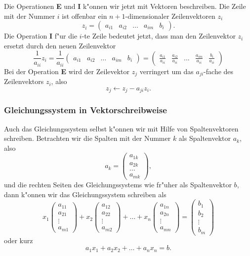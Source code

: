 Die Operationen {\bf E} und {\bf I} k"onnen wir jetzt mit Vektoren
beschreiben. Die Zeile mit der Nummer $i$ ist offenbar ein
$n+1$-dimensionaler Zeilenvektoren $z_i$
$$z_i=\begin{pmatrix}a_{i1}&a_{i2}&\dots&a_{im}&b_i\end{pmatrix}.$$
Die Operation {\bf I} f"ur die $i$-te Zeile bedeutet jetzt, dass man
den Zeilenvektor $z_i$ ersetzt durch den neuen Zeilenvektor
$$\frac1{a_{ii}}z_i
=
\frac1{a_{ii}}
\begin{pmatrix}a_{i1}&a_{i2}&\dots&a_{im}&b_i\end{pmatrix}
=
\begin{pmatrix}\frac{a_{i1}}{a_{ii}}&\frac{a_{i2}}{a_{ii}}&\dots&\frac{a_{im}}{a_{ii}}&\frac{b_i}{a_{ii}}\end{pmatrix}
$$
Bei der Operation {\bf E} wird der Zeilevektor $z_j$
verringert um das $a_{ji}$-fache des Zeilenvektors $z_i$, also
$$z_j \leftarrow z_j-a_{ji}z_i.$$

\subsubsection{Gleichungssystem in Vektorschreibweise}
Auch das Gleichungssystem selbst k"onnen wir mit Hilfe von Spaltenvektoren
schreiben. Betrachten wir die Spalten mit der Nummer $k$ als Spaltenvektor $a_k$,
also
$$a_k=\begin{pmatrix}a_{1k}\\a_{2k}\\\dots\\a_{mk}\end{pmatrix},$$
und die rechten Seiten des Gleichungssystems wie fr"uher als Spaltenvektor $b$,
dann k"onnen wir das Gleichungssystem schreiben als
$$
x_1\begin{pmatrix}a_{11}\\a_{21}\\\vdots\\a_{m1}\end{pmatrix}
+
x_2\begin{pmatrix}a_{12}\\a_{22}\\\vdots\\a_{m2}\end{pmatrix}
+
\dots
+
x_n\begin{pmatrix}a_{1n}\\a_{2n}\\\vdots\\a_{mn}\end{pmatrix}
=
\begin{pmatrix}b_1\\b_2\\\vdots\\b_m\end{pmatrix}
$$
oder kurz
$$
a_1x_1+a_2x_2+\dots+a_nx_n=b.
$$

